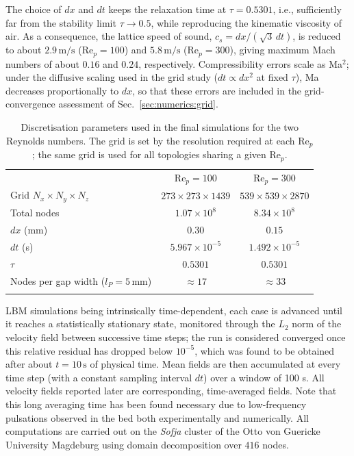 The choice of $dx$ and $dt$ keeps the relaxation time at $\tau = 0.5301$, i.e., sufficiently far from the stability limit $\tau\to 0.5$, while reproducing the kinematic viscosity of air. As a consequence, the lattice speed of sound, $c_s = dx/(\sqrt{3}\,dt)$, is reduced to about $2.9\,\mathrm{m/s}$ (Re$_p=100$) and $5.8\,\mathrm{m/s}$ (Re$_p=300$), giving maximum Mach numbers of about $0.16$ and $0.24$, respectively. Compressibility errors scale as Ma$^2$; under the diffusive scaling used in the grid study ($dt\propto dx^2$ at fixed $\tau$), Ma decreases proportionally to $dx$, so that these errors are included in the grid-convergence assessment of Sec.~\ref{sec:numerics:grid}.
\begin{table}[tbp]
\caption{Discretisation parameters used in the final simulations for the two Reynolds numbers. The grid is set by the resolution required at each Re$_p$; the same grid is used for all topologies sharing a given Re$_p$.}
\label{tab:simparams}
\begin{tabular}{lcc}
\hline\noalign{\smallskip}
 & Re$_p = 100$ & Re$_p = 300$ \\
\noalign{\smallskip}\hline\noalign{\smallskip}
Grid $N_x\times N_y\times N_z$      & $273\times273\times1439$ & $539\times539\times2870$ \\
Total nodes                          & $1.07\times10^{8}$       & $8.34\times10^{8}$       \\
$dx$ (mm)                      & $0.30$                   & $0.15$                   \\
$dt$ (s)                       & $5.967\times10^{-5}$     & $1.492\times10^{-5}$     \\
$\tau$                               & $0.5301$                 & $0.5301$                 \\
Nodes per gap width ($l_P = 5\,$mm)       & $\approx 17$              & $\approx 33$              \\
\noalign{\smallskip}\hline
\end{tabular}
\end{table}

LBM simulations being intrinsically time-dependent, each case is advanced until it reaches a statistically stationary state, monitored through the $L_2$ norm of the velocity field between successive time steps; the run is
considered converged once this relative residual has dropped below $10^{-5}$, which was found to be obtained after about $t = 10\,\mathrm{s}$ of physical time. Mean fields are then accumulated at every time step (with a constant sampling interval $dt$) over a window of 100 s. All velocity fields reported later are corresponding, time-averaged fields. Note that this long averaging time has been found necessary due to low-frequency pulsations observed in the bed both experimentally and numerically. All computations are carried out on the \emph{Sofja} cluster of the Otto von Guericke University Magdeburg using domain decomposition over $416$ nodes.

